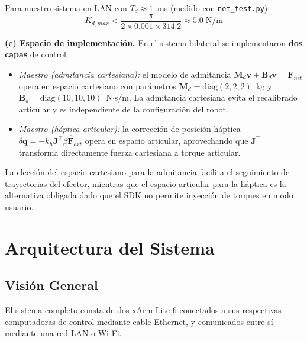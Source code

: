 \documentclass[journal,10pt,twoside]{IEEEtran}
\begin{document}
Para nuestro sistema en LAN con $T_d \approx 1$~ms (medido con
\texttt{net\_test.py}):
\begin{equation}
  K_{d,max} < \frac{\pi}{2 \times 0.001 \times 314.2} \approx 5.0 \; \text{N/m}
  \label{eq:kdmax_1ms}
\end{equation}

\textbf{(c) Espacio de implementación.}
En el sistema bilateral se implementaron \textbf{dos capas} de control:
\begin{itemize}
  \item \textit{Maestro (admitancia cartesiana):} el modelo de
        admitancia $\bm{M}_d\dot{\bm{v}} + \bm{B}_d\bm{v} = \bm{F}_{net}$
        opera en espacio cartesiano con parámetros
        $\bm{M}_d = \text{diag}(2,2,2)$~kg y
        $\bm{B}_d = \text{diag}(10,10,10)$~N$\cdot$s/m.
        La admitancia cartesiana evita el recalibrado articular y es
        independiente de la configuración del robot.
  \item \textit{Maestro (háptica articular):} la corrección de posición
        háptica $\delta\bm{q} = -k_h\bm{J}^\top\beta\hat{\bm{F}}_{ext}$
        opera en espacio articular, aprovechando que $\bm{J}^\top$
        transforma directamente fuerza cartesiana a torque articular.
\end{itemize}
La elección del espacio cartesiano para la admitancia facilita el
seguimiento de trayectorias del efector, mientras que el espacio
articular para la háptica es la alternativa obligada dado que el SDK
no permite inyección de torques en modo usuario.

\section{Arquitectura del Sistema}
\label{sec:architecture}

\subsection{Visión General}

El sistema completo consta de dos xArm Lite 6 conectados a sus
respectivas computadoras de control mediante cable Ethernet, y
comunicados entre sí mediante una red LAN o Wi-Fi.
\end{document}
